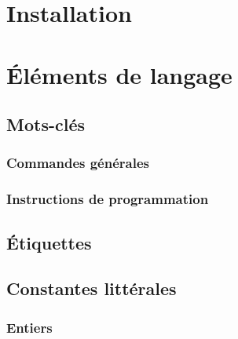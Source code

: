 \documentclass[11pt,a4paper,titlepage,openany,oneside]{book}
\begin{document}
    \renewcommand\rmdefault{pag}
    \selectfont
    \renewcommand{\sfdefault}{pag}


    \renewcommand{\contentsname}{Sommaire}
    \tableofcontents


    \chapter{Installation}
        

    \chapter{Éléments de langage}
        

        \section{Mots-clés}
            

            \subsection{Commandes générales}
                

            \subsection{Instructions de programmation}
                

        \section{Étiquettes}
            

        \section{Constantes littérales}
             

             \subsection{Entiers}
                
\end{document}
